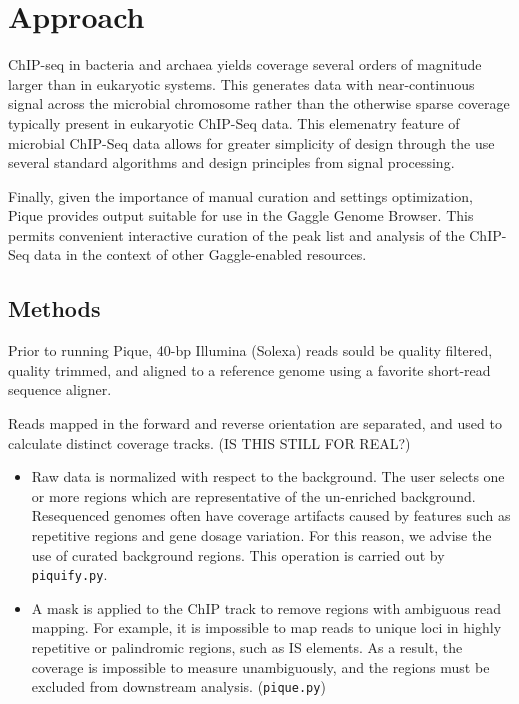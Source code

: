 \documentclass{bioinfo} %
\begin{document}
{\section{Approach} ChIP-seq in bacteria and archaea yields coverage
several orders of magnitude larger than in eukaryotic systems.  This
generates data with near-continuous signal across the microbial
chromosome rather than the otherwise sparse coverage typically present
in eukaryotic ChIP-Seq data.  This elemenatry feature of microbial
ChIP-Seq data allows for greater simplicity of design through the use
several standard algorithms and design principles from signal
processing.

Finally, given the importance of manual curation and settings
optimization, Pique provides output suitable for use in the Gaggle
Genome Browser. This permits convenient interactive curation of the peak
list and analysis of the ChIP-Seq data in the context of other
Gaggle-enabled resources.






\begin{methods} \section{Methods}

Prior to running Pique, 40-bp Illumina (Solexa) reads sould be quality
filtered, quality trimmed, and aligned to a reference genome using a
favorite short-read sequence aligner.

Reads mapped in the forward and reverse orientation are separated, and
used to calculate distinct coverage tracks. (IS THIS STILL FOR REAL?)

\begin{itemize}

\item Raw data is normalized with respect to the background. The user
selects one or more regions which are representative of the un-enriched
background. Resequenced genomes often have coverage artifacts caused by
features such as repetitive regions and gene dosage variation. For this
reason, we advise the use of curated background regions. This operation
is carried out by \texttt{piquify.py}.

\item A mask is applied to the ChIP track to remove regions with
ambiguous read mapping. For example, it is impossible to map reads to
unique loci in highly repetitive or palindromic regions, such as IS
elements. As a result, the coverage is impossible to measure
unambiguously, and the regions must be excluded from downstream
analysis. (\texttt{pique.py})


\end{itemize}
\end{methods}}
\end{document}
